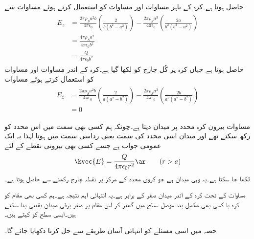 حاصل ہوتا ہے۔کرہ کے باہر مساوات  اور مساوات   کو استعمال کرتے ہوئے مساوات  سے
\begin{gather}
\begin{aligned}\label{مساوات_کولمب_کرہ_چارج_کا_میدان_ب}
E_z&=\frac{2 \pi\rho_S a^2 b}{4 \pi \epsilon_0} \left(\frac{2}{b(b^2-a^2)}\right)-\frac{2 \pi\rho_S a^3}{4 \pi \epsilon_0} \left(\frac{2a}{b^2(b^2-a^2)}\right)\\
&=\frac{4 \pi \rho_S a^2}{4\pi \epsilon_0 b^2}\\
&=\frac{Q}{4\pi \epsilon_0 b^2}
\end{aligned}
\end{gather}
حاصل ہوتا ہے جہاں  کرہ پر کُل چارج  کو  لکھا گیا ہے۔کرہ کے اندر مساوات  اور مساوات   کو استعمال کرتے ہوئے مساوات 
\begin{gather}
\begin{aligned}\label{مساوات_کولمب_کرہ_چارج_کا_میدان_پ}
E_z&=\frac{2 \pi\rho_S a^2 b}{4 \pi \epsilon_0} \left(\frac{2}{a(a^2-b^2)}\right)-\frac{2 \pi\rho_S a^3}{4 \pi \epsilon_0} \left(\frac{2b}{a^2(a^2-b^2)}\right)\\
&=0
\end{aligned}
\end{gather}

مساوات  بیرون کرہ  محدد پر میدان دیتا ہے۔چونکہ ہم کسی بھی سمت میں اس محدد کو رکھ سکتے تھے اور میدان اسی محدد کی سمت یعنی رداسی سمت میں ہوتا  لہٰذا یہ ایک عمومی جواب ہے جسے کسی بھی بیرونی نقطے کے لئے
\begin{align}
\kvec{E}=\frac{Q}{4\pi \epsilon_0 r^2} \ar  \quad \quad (r>a)
\end{align}
لکھا جا سکتا ہے۔یہ وہی میدان ہے جو کروی محدد کے مرکز پر  نقطہ چارج رکھنے سے حاصل ہوتا ہے۔

مساوات  کے تحت کرہ کے اندر میدان صفر کے برابر ہے۔یہ انتہائی اہم نتیجہ ہے۔ہم کسی بھی مقام کو کرہ یا کسی بھی مکمل بند موصل سطح میں گھیر کر اس مقام پر صفر برقی میدان یقینی بنا سکتے ہیں۔ایسی سطح کو  کہتے ہیں۔

حصہ  میں اسی مسئلے کو انتہائی آسان طریقے سے حل کرنا دکھایا جائے گا۔

